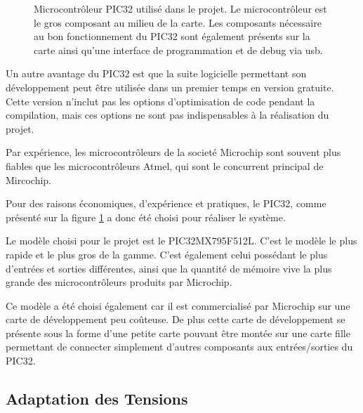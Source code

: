 \documentclass[letterpaper, twoside, 12pt, memoire, creativecommons, hyperref]{thETS}
\begin{document}
\begin{figure}
	\centering
	\caption{Microcontrôleur PIC32 utilisé dans le projet. Le microcontrôleur est le gros composant au milieu de la carte. Les composants nécessaire au bon fonctionnement du PIC32 sont également présents sur la carte ainsi qu'une interface de programmation et de debug via usb.}
	\label{fig:pic32}
\end{figure}


Un autre avantage du PIC32 est que la suite logicielle permettant son développement peut être utilisée dans un premier temps en version gratuite. Cette version n'inclut pas les options d'optimisation de code pendant la compilation, mais ces options ne sont pas indispensables à la réalisation du projet. 

Par expérience, les microcontrôleurs de la societé Microchip sont souvent plus fiables que les microcontrôleurs Atmel, qui sont le concurrent principal de Mircochip.

Pour des raisons économiques, d'expérience et pratiques, le PIC32, comme présenté sur la figure \ref{fig:pic32} a donc été choisi pour réaliser le système.
 
Le modèle choisi pour le projet est le PIC32MX795F512L. C'est le modèle le plus rapide et le plus gros de la gamme. C'est également celui possédant le plus d'entrées et sorties différentes, ainsi que la quantité de mémoire vive la plus grande des microcontrôleurs produits par Microchip.

Ce modèle a été choisi également car il est commercialisé par Microchip sur une carte de développement peu coûteuse. De plus cette carte de développement se présente sous la forme d'une petite carte pouvant être montée sur une carte fille permettant de connecter simplement d'autres composants aux entrées/sorties du PIC32. 


\subsection{Adaptation des Tensions}
\end{document}
